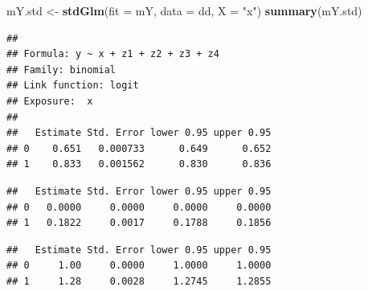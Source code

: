 \documentclass[
]{book}
\newenvironment{Shaded}{\begin{snugshade}}{\end{snugshade}}
\newcommand{\AttributeTok}[1]{\textcolor[rgb]{0.13,0.29,0.53}{#1}}
\newcommand{\DecValTok}[1]{\textcolor[rgb]{0.00,0.00,0.81}{#1}}
\newcommand{\FunctionTok}[1]{\textcolor[rgb]{0.13,0.29,0.53}{\textbf{#1}}}
\newcommand{\NormalTok}[1]{#1}
\newcommand{\OtherTok}[1]{\textcolor[rgb]{0.56,0.35,0.01}{#1}}
\newcommand{\SpecialCharTok}[1]{\textcolor[rgb]{0.81,0.36,0.00}{\textbf{#1}}}
\newcommand{\StringTok}[1]{\textcolor[rgb]{0.31,0.60,0.02}{#1}}
\begin{document}
\begin{Shaded}
\begin{Highlighting}[]
\NormalTok{mY.std }\OtherTok{\textless{}{-}} \FunctionTok{stdGlm}\NormalTok{(}\AttributeTok{fit =}\NormalTok{ mY, }\AttributeTok{data =}\NormalTok{ dd, }\AttributeTok{X =} \StringTok{"x"}\NormalTok{)}
\FunctionTok{summary}\NormalTok{(mY.std)}
\end{Highlighting}
\end{Shaded}

\begin{verbatim}
## 
## Formula: y ~ x + z1 + z2 + z3 + z4
## Family: binomial 
## Link function: logit 
## Exposure:  x 
## 
##   Estimate Std. Error lower 0.95 upper 0.95
## 0    0.651   0.000733      0.649      0.652
## 1    0.833   0.001562      0.830      0.836
\end{verbatim}

\begin{Shaded}
\end{Shaded}

\begin{verbatim}
##   Estimate Std. Error lower 0.95 upper 0.95
## 0   0.0000     0.0000     0.0000     0.0000
## 1   0.1822     0.0017     0.1788     0.1856
\end{verbatim}

\begin{Shaded}
\end{Shaded}

\begin{verbatim}
##   Estimate Std. Error lower 0.95 upper 0.95
## 0     1.00     0.0000     1.0000     1.0000
## 1     1.28     0.0028     1.2745     1.2855
\end{verbatim}

\begin{Shaded}
\end{Shaded}
\end{document}

